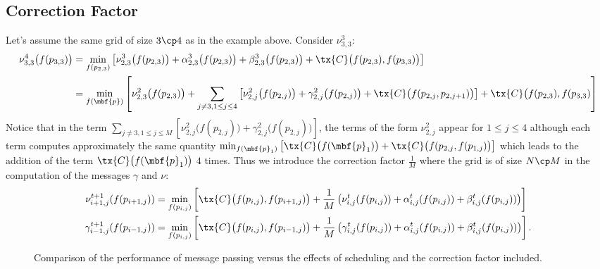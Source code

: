 \documentclass[journal, onecolumn]{IEEEtran}
\begin{document}
\subsection{Correction Factor}
Let's assume the same grid of size $3\cp 4$ as in the example above. Consider $\nu^{3}_{3,3}$:
\begin{align*}
\nu^{4}_{3,3}\big(f(p_{3,3})\big)&=\min_{f(p_{2,3})}\left[\nu^{3}_{2,3}\big(f(p_{2,3})\big)+\alpha^{3}_{2,3}\big(f(p_{2,3})\big)+\beta^{3}_{2,3}\big(f(p_{2,3})\big)+\tx{C}\big(f(p_{2,3}),f(p_{3,3})\big)\right]\\
&=\min_{f(\mbf{p})}\left[\nu^{2}_{2,3}\big(f(p_{2,3})\big)+\sum_{j \neq 3,1\leq j \leq 4}\left[\nu^{2}_{2,j}\big(f(p_{2,j})\big)+\gamma^{2}_{2,j}\big(f(p_{2,j})\big)+\tx{C}\big(f(p_{2,j},p_{2,j+1})\big)\right]+\tx{C}\big(f(p_{2,3}),f(p_{3,3})\right]\\
\end{align*}
Notice that in the term  $\sum_{j \neq 3,1\leq j \leq M}\left[\nu^{2}_{2,j}\big(f(p_{2,j})\big)+\gamma^{2}_{2,j}\big(f(p_{2,j})\big)\right]$, the terms of the form $\nu^{2}_{2,j}$ appear for $1\leq j \leq 4$ although each term  computes approximately the same quantity $\min_{f(\mbf{p}_{1})}\left[\tx{C}\big(f(\mbf{p}_{1})\big)+\tx{C}\big(f(p_{2,j},f(p_{1,j})\big)\right]$ which leads to the addition of the term $\tx{C}\big(f(\mbf{p}_{1})\big)$ $4$ times. Thus we introduce the correction factor $\frac{1}{M}$ where the grid is of size $N \cp M$ in the computation of the messages $\gamma$ and $\nu$:
\begin{align}
\nu_{i+1,j}^{t+1}(f(p_{i+1,j}))&=\min_{f(p_{i,j})}\left[\tx{C}\big(f(p_{i,j}),f(p_{i+1,j})\big)+\frac{1}{M}\left(\nu_{i,j}^{t}(f(p_{i,j})) +\alpha_{i,j}^{t}(f(p_{i,j})) +\beta_{i,j}^{t}(f(p_{i,j}))\right)\right]\notag\\
\gamma_{i-1,j}^{t+1}(f(p_{i-1,j}))&=\min_{f(p_{i,j})}\left[\tx{C}\big(f(p_{i,j}),f(p_{i-1,j})\big)+\frac{1}{M}\left(\gamma_{i,j}^{t}(f(p_{i,j})) +\alpha_{i,j}^{t}(f(p_{i,j})) + \beta_{i,j}^{t}(f(p_{i,j}))\right)\right].
\label{Eqn:MP_Correction}
\end{align}
\begin{figure}[h]
\centering

\caption{Comparison of the performance of message passing versus the effects of scheduling and the correction factor included.}
\label{Fig:Comparison_MP_Schemes}
\end{figure}
\end{document}
